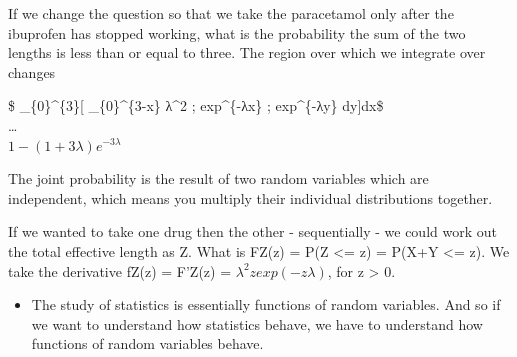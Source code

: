 \documentclass[]{book}
\providecommand{\tightlist}{%
  \setlength{\itemsep}{0pt}\setlength{\parskip}{0pt}}
\theoremstyle{definition}
\theoremstyle{definition}
\theoremstyle{definition}
\theoremstyle{remark}
\begin{document}
If we change the question so that we take the paracetamol only after the
ibuprofen has stopped working, what is the probability the sum of the
two lengths is less than or equal to three. The region over which we
integrate over changes

\$ \int\_\{0\}\^{}\{3\}{[} \int\_\{0\}\^{}\{3-x\} λ\^{}2 ;
exp\^{}\{-λx\} ; exp\^{}\{-λy\} dy{]}dx\$\\
\ldots{}\\
\(1-(1 + 3λ) e^{-3λ}\)

The joint probability is the result of two random variables which are
independent, which means you multiply their individual distributions
together.

If we wanted to take one drug then the other - sequentially - we could
work out the total effective length as Z. What is FZ(z) = P(Z
\textless{}= z) = P(X+Y \textless{}= z). We take the derivative fZ(z) =
F'Z(z) = \(λ^2zexp(- zλ)\), for z \textgreater{} 0.

\begin{itemize}
\tightlist
\item
  The study of statistics is essentially functions of random variables.
  And so if we want to understand how statistics behave, we have to
  understand how functions of random variables behave.
\end{itemize}


\end{document}
